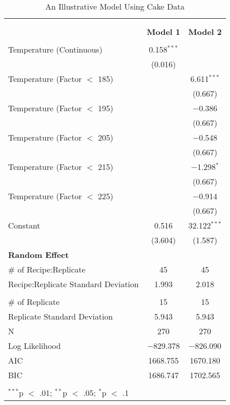 
\begin{table}[!htbp] \centering 
  \caption{An Illustrative Model Using Cake Data} 
  \label{} 
\begin{tabular}{@{\extracolsep{5pt}}lcc} 
\\[-1.8ex]\hline \\[-1.8ex] 
\\[-1.8ex] & \textbf{Model 1} & \textbf{Model 2}\\ 
\hline \\[-1.8ex] 
 Temperature (Continuous) & 0.158$^{***}$ &  \\ 
  & (0.016) &  \\ 
  Temperature (Factor $<$ 185) &  & 6.611$^{***}$ \\ 
  &  & (0.667) \\ 
  Temperature (Factor $<$ 195) &  & $-$0.386 \\ 
  &  & (0.667) \\ 
  Temperature (Factor $<$ 205) &  & $-$0.548 \\ 
  &  & (0.667) \\ 
  Temperature (Factor $<$ 215) &  & $-$1.298$^{*}$ \\ 
  &  & (0.667) \\ 
  Temperature (Factor $<$ 225) &  & $-$0.914 \\ 
  &  & (0.667) \\ 
  Constant & 0.516 & 32.122$^{***}$ \\ 
  & (3.604) & (1.587) \\ 
\hline
{\bf Random Effect} & & \\
\hline
\# of Recipe:Replicate &  45 & 45 \\
Recipe:Replicate Standard Deviation &  1.993 & 2.018 \\
\\
\# of Replicate &  15 & 15 \\
Replicate Standard Deviation &  5.943 & 5.943 \\
 N & 270 & 270 \\ 
Log Likelihood & $-$829.378 & $-$826.090 \\ 
AIC & 1668.755 & 1670.180 \\ 
BIC & 1686.747 & 1702.565 \\ 
\hline \\[-1.8ex] 
\multicolumn{3}{l}{$^{***}$p $<$ .01; $^{**}$p $<$ .05; $^{*}$p $<$ .1} \\ 
\end{tabular} 
\end{table} 
